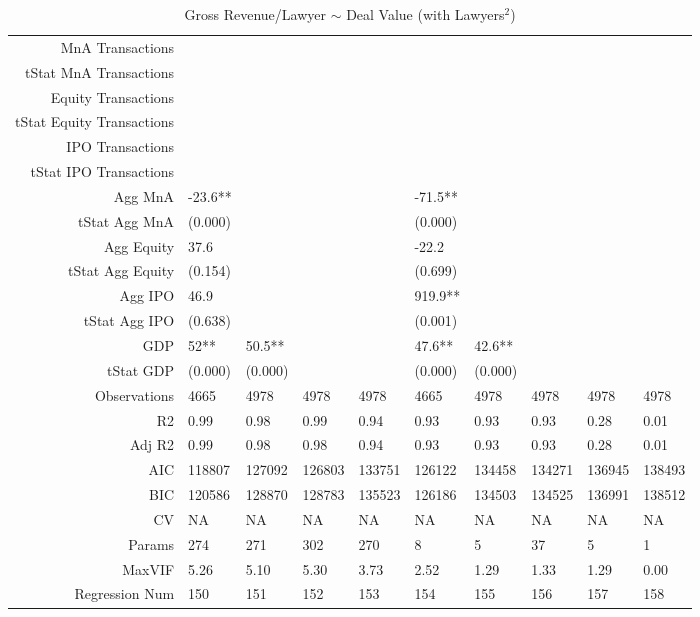 \begin{table}[ht]
\begin{tabular}{rlllllllll}
  MnA Transactions &  &  &  &  &  &  &  &  &  \\ 
  tStat MnA Transactions &  &  &  &  &  &  &  &  &  \\ 
  Equity Transactions &  &  &  &  &  &  &  &  &  \\ 
  tStat Equity Transactions &  &  &  &  &  &  &  &  &  \\ 
  IPO Transactions &  &  &  &  &  &  &  &  &  \\ 
  tStat IPO Transactions &  &  &  &  &  &  &  &  &  \\ 
  Agg MnA & -23.6** &  &  &  & -71.5** &  &  &  &  \\ 
  tStat Agg MnA & (0.000) &  &  &  & (0.000) &  &  &  &  \\ 
  Agg Equity & 37.6 &  &  &  & -22.2 &  &  &  &  \\ 
  tStat Agg Equity & (0.154) &  &  &  & (0.699) &  &  &  &  \\ 
  Agg IPO & 46.9 &  &  &  & 919.9** &  &  &  &  \\ 
  tStat Agg IPO & (0.638) &  &  &  & (0.001) &  &  &  &  \\ 
  GDP & 52** & 50.5** &  &  & 47.6** & 42.6** &  &  &  \\ 
  tStat GDP & (0.000) & (0.000) &  &  & (0.000) & (0.000) &  &  &  \\ 
  Observations & 4665 & 4978 & 4978 & 4978 & 4665 & 4978 & 4978 & 4978 & 4978 \\ 
  R2 & 0.99 & 0.98 & 0.99 & 0.94 & 0.93 & 0.93 & 0.93 & 0.28 & 0.01 \\ 
  Adj R2 & 0.99 & 0.98 & 0.98 & 0.94 & 0.93 & 0.93 & 0.93 & 0.28 & 0.01 \\ 
  AIC & 118807 & 127092 & 126803 & 133751 & 126122 & 134458 & 134271 & 136945 & 138493 \\ 
  BIC & 120586 & 128870 & 128783 & 135523 & 126186 & 134503 & 134525 & 136991 & 138512 \\ 
  CV & NA & NA & NA & NA & NA & NA & NA & NA & NA \\ 
  Params & 274 & 271 & 302 & 270 & 8 & 5 & 37 & 5 & 1 \\ 
  MaxVIF & 5.26 & 5.10 & 5.30 & 3.73 & 2.52 & 1.29 & 1.33 & 1.29 & 0.00 \\ 
  Regression Num & 150 & 151 & 152 & 153 & 154 & 155 & 156 & 157 & 158 \\ 
   \hline
\end{tabular}
\caption{Gross Revenue/Lawyer $\sim$ Deal Value (with Lawyers$^2$)} 
\end{table}

